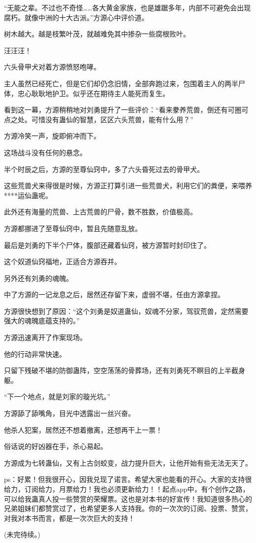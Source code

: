 \begin{this_body}
“无能之辈。不过也不奇怪……各大黄金家族，也是雄踞多年，内部不可避免会出现腐朽。就像中洲的十大古派。”方源心中评价道。

树木越大。越是枝繁叶茂，就越难免其中掺杂一些腐根败叶。

汪汪汪！

六头骨甲犬对着方源愤怒咆哮。

主人虽然已经死亡，但是它们却仍念旧情，全部奔跑过来，包围着主人的两半尸体，忠心耿耿地护卫。似乎还在期待主人能死而复生。

看到这一幕，方源稍稍地对刘勇提升了一些评价：“看来豢养荒兽，倒还有可圈可点之处。可惜没有蛊仙的智慧，区区六头荒兽，能有什么用？”

方源冷笑一声，旋即俯冲而下。

这场战斗没有任何的悬念。

半个时辰之后，方源的至尊仙窍中，多了六头昏死过去的骨甲犬。

这些荒兽犬来得很是时候，方源正打算引进一些荒兽犬，利用它们的粪便，来喂养****运仙蛊呢。

此外还有海量的荒兽、上古荒兽的尸骨，数不胜数，价值极高。

方源都挪进了至尊仙窍中，暂且先随意乱放。

最后是刘勇的下半个尸体，腹部还藏着仙窍，被方源暂时封印住了。

这个奴道仙窍福地，正适合方源吞并。

另外还有刘勇的魂魄。

中了方源的一记龙息之后，居然还存留下来，虚弱不堪，任由方源拿捏。

方源很快想到了原因：“这个刘勇是奴道蛊仙，奴魂不分家，驾驭荒兽，定然需要强大的魂魄底蕴支持的。”

方源迅速离开了作案现场。

他的行动非常快速。

只留下残破不堪的防御蛊阵，空空荡荡的骨葬场，还有刘勇死不瞑目的上半截身躯。

“下一个地点，就是刘家的璇光坑。”

方源舔了舔嘴角，目光中透露出一丝兴奋。

他杀人犯案，居然还不想着撤离，还想再干上一票！

俗话说的好凶器在手，杀心易起。

方源成为七转蛊仙，又有上古剑蛟变，战力提升巨大，让他开始有些无法无天了。

ps：好累！但我很开心，因我兑现了诺言。希望大家也能看的开心。大家的支持很给力，订阅给力，月票给力！我也必须更新给力！！起点app中，有个创作之路，可以给我蛊真人投一些赞赏的荣耀票。这也是对本书的好宣传！我知道很多热心的兄弟姐妹们都赞赏过了，也希望更多人支持我。你的一次次的订阅、投票、赞赏，对我对本书而言，都是一次次巨大的支持！

(未完待续。)

\end{this_body}

